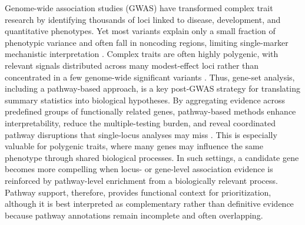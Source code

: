 \documentclass[unnumsec,webpdf,contemporary,large]{oup-authoring-template}%
\theoremstyle{thmstyleone}%
\theoremstyle{thmstyletwo}%
\theoremstyle{thmstylethree}%
\begin{document}
Genome-wide association studies (GWAS) have transformed complex trait research by identifying thousands of loci linked to disease, development, and quantitative phenotypes. Yet most variants explain only a small fraction of phenotypic variance and often fall in noncoding regions, limiting single-marker mechanistic interpretation \citep{Manolio2009,Boyle2017}. Complex traits are often highly polygenic, with relevant signals distributed across many modest-effect loci rather than concentrated in a few genome-wide significant variants \citep{Akula2025,Lappalainen2024}. Thus, gene-set analysis, including a pathway-based approach, is a key post-GWAS strategy for translating summary statistics into biological hypotheses. By aggregating evidence across predefined groups of functionally related genes, pathway-based methods enhance interpretability, reduce the multiple-testing burden, and reveal coordinated pathway disruptions that single-locus analyses may miss \citep{Mooney2015,deLeeuw2015}. This is especially valuable for polygenic traits, where many genes may influence the same phenotype through shared biological processes. In such settings, a candidate gene becomes more compelling when locus- or gene-level association evidence is reinforced by pathway-level enrichment from a biologically relevant process. Pathway support, therefore, provides functional context for prioritization, although it is best interpreted as complementary rather than definitive evidence because pathway annotations remain incomplete and often overlapping.
\end{document}
